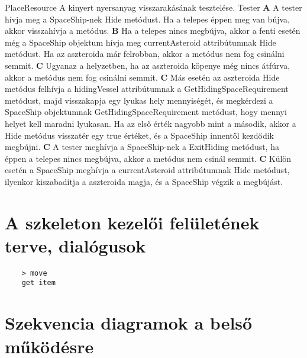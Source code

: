 \documentclass[../../projlab]{subfiles}
\begin{document}
\begin{use-case}
    {PlaceResource}
    {A kinyert nyersanyag visszarakásának tesztelése.}
    {Tester} 
    \textbf{A} A tester hívja meg a SpaceShip-nek Hide metódust. Ha a telepes éppen meg van bújva, akkor visszahívja a metódus. \newline
    \textbf{B} Ha a telepes nincs megbújva, akkor a fenti esetén még a SpaceShip objektum hívja meg currentAsteroid attribútumnak Hide metódust. Ha az aszteroida már felrobban, akkor a metódus nem fog csinálni semmit. \newline
    \textbf{C} Ugyanaz a helyzetben, ha az aszteroida köpenye még nincs átfúrva, akkor a metódus nem fog csinálni semmit. \newline
    \textbf{C} Más esetén az aszteroida Hide metódus felhívja a hidingVessel attribútumnak a GetHidingSpaceRequirement metódust, majd visszakapja egy lyukas hely mennyiségét, és megkérdezi a SpaceShip objektumnak GetHidingSpaceRequirement metódust, hogy mennyi helyet kell maradni lyukasan. Ha az első érték nagyobb mint a második, akkor a Hide metódus visszatér egy true értéket, és a SpaceShip innentől kezdődik megbújni. \newline
    \textbf{C} A tester meghívja a SpaceShip-nek a ExitHiding metódust, ha éppen a telepes nincs megbújva, akkor a metódus nem csinál semmit. \newline
    \textbf{C} Külön esetén a SpaceShip meghívja a currentAsteroid attribútumnak Hide metódust, ilyenkor kiszabadítja a aszteroida magja, és a SpaceShip végzik a megbújást. \newline
\end{use-case}

\section{A szkeleton kezelői felületének terve, dialógusok}



\begin{verbatim}
    > move
    get item
\end{verbatim}

\section{Szekvencia diagramok a belső működésre}
\end{document}
